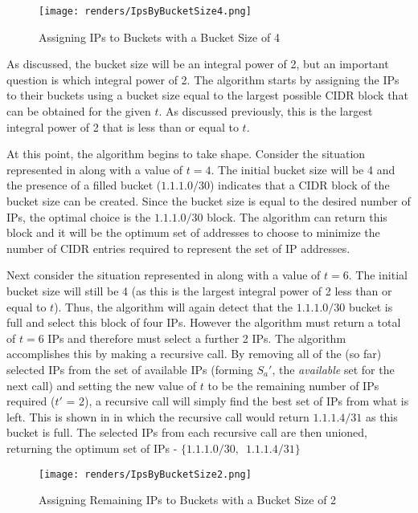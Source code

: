 \begin{figure}[H]
      \centering
      \texttt{[image: renders/IpsByBucketSize4.png]}
      \caption{Assigning IPs to Buckets with a Bucket Size of 4}
      \label{fig:exampleIpsByBucket4}
\end{figure}

As discussed, the bucket size will be an integral power of 2, but an important question is which integral power of 2. The algorithm starts by assigning the IPs to their buckets using a bucket size equal to the largest possible CIDR block that can be obtained for the given $t$. As discussed previously, this is the largest integral power of 2 that is less than or equal to $t$.

At this point, the algorithm begins to take shape. Consider the situation represented in  along with a value of $t = 4$. The initial bucket size will be 4 and the presence of a filled bucket ($1.1.1.0/30$) indicates that a CIDR block of the bucket size can be created. Since the bucket size is equal to the desired number of IPs, the optimal choice is the $1.1.1.0/30$ block. The algorithm can return this block and it will be the optimum set of addresses to choose to minimize the number of CIDR entries required to represent the set of IP addresses.

Next consider the situation represented in  along with a value of $t = 6$. The initial bucket size will still be 4 (as this is the largest integral power of 2 less than or equal to $t$). Thus, the algorithm will again detect that the $1.1.1.0/30$ bucket is full and select this block of four IPs. However the algorithm must return a total of $t = 6$ IPs and therefore must select a further 2 IPs. The algorithm accomplishes this by making a recursive call. By removing all of the (so far) selected IPs from the set of available IPs (forming $S_a'$, the \textit{available} set for the next call) and setting the new value of $t$ to be the remaining number of IPs required ($t'$ = 2), a recursive call will simply find the best set of IPs from what is left. This is shown in  in which the recursive call would return $1.1.1.4/31$ as this bucket is full. The selected IPs from each recursive call are then unioned, returning the optimum set of IPs - $\{1.1.1.0/30,\enspace1.1.1.4/31\}$

\begin{figure}[H]
      \centering
      \texttt{[image: renders/IpsByBucketSize2.png]}
      \caption{Assigning Remaining IPs to Buckets with a Bucket Size of 2}
      \label{fig:exampleIpsByBucket2}
\end{figure}

